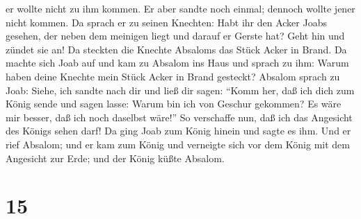 er wollte nicht zu ihm kommen. Er aber sandte noch einmal; dennoch
wollte jener nicht kommen.  Da sprach er zu seinen
Knechten: Habt ihr den Acker Joabs gesehen, der neben dem meinigen liegt
und darauf er Gerste hat? Geht hin und zündet sie an! Da steckten die
Knechte Absaloms das Stück Acker in Brand.  Da machte
sich Joab auf und kam zu Absalom ins Haus und sprach zu ihm: Warum haben
deine Knechte mein Stück Acker in Brand gesteckt? 
Absalom sprach zu Joab: Siehe, ich sandte nach dir und ließ dir sagen:
``Komm her, daß ich dich zum König sende und sagen lasse: Warum bin ich
von Geschur gekommen? Es wäre mir besser, daß ich noch daselbst wäre!''
So verschaffe nun, daß ich das Angesicht des Königs sehen darf!
 Da ging Joab zum König hinein und sagte es ihm. Und er
rief Absalom; und er kam zum König und verneigte sich vor dem König mit
dem Angesicht zur Erde; und der König küßte Absalom.

\hypertarget{section-14}{%
\section{15}\label{section-14}}

